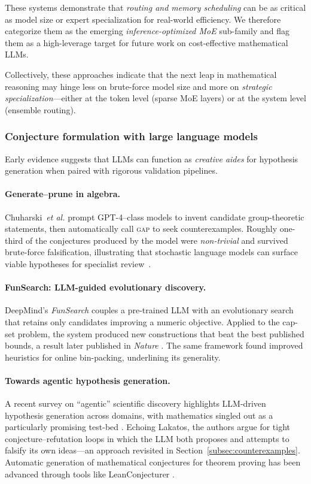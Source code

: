\documentclass[acmsmall,anonymous]{acmart}
\begin{document}
\noindent
These systems demonstrate that \emph{routing and memory scheduling} can be as critical as model size or expert specialization for real-world efficiency.  We therefore categorize them as the emerging \emph{inference-optimized MoE} sub-family and flag them as a high-leverage target for future work on cost-effective mathematical LLMs.%

Collectively, these approaches indicate that the next leap in
mathematical reasoning may hinge less on brute-force model size and more
on \emph{strategic specialization}—either at the token level (sparse MoE
layers) or at the system level (ensemble routing).


\subsubsection{Conjecture formulation with large language models}
\label{subsec:conjLLM}
Early evidence suggests that LLMs can function as \emph{creative aides}
for hypothesis generation when paired with rigorous validation
pipelines.

\paragraph{Generate–prune in algebra.}
Chuharski~\emph{et al.} prompt GPT-4–class models to invent candidate
group-theoretic statements, then automatically call \textsc{gap} to seek
counterexamples. Roughly one-third of the conjectures produced by the
model were \emph{non-trivial} and survived brute-force falsification,
illustrating that stochastic language models can surface viable
hypotheses for specialist review~\cite{chuharski2024conjecture}.

\paragraph{FunSearch: LLM-guided evolutionary discovery.}
DeepMind’s \emph{FunSearch} couples a pre-trained LLM with an
evolutionary search that retains only candidates improving a numeric
objective. Applied to the cap-set problem, the system produced new
constructions that beat the best published bounds, a result
later published in \emph{Nature}
\cite{romeraparedes2024funsearch}. The same framework found improved
heuristics for online bin-packing, underlining its generality.

\paragraph{Towards agentic hypothesis generation.}
A recent survey on “agentic” scientific discovery highlights LLM-driven
hypothesis generation across domains, with mathematics singled out as a
particularly promising test-bed
\cite{agentichypothesis2025survey}. Echoing Lakatos, the authors argue
for tight conjecture–refutation loops in which the LLM both proposes and
attempts to falsify its own ideas—an approach revisited in
Section~\ref{subsec:counterexamples}. Automatic generation of mathematical conjectures for theorem proving has been advanced through tools like LeanConjecturer \cite{anonymous2025leanconjecturer}.
\end{document}

